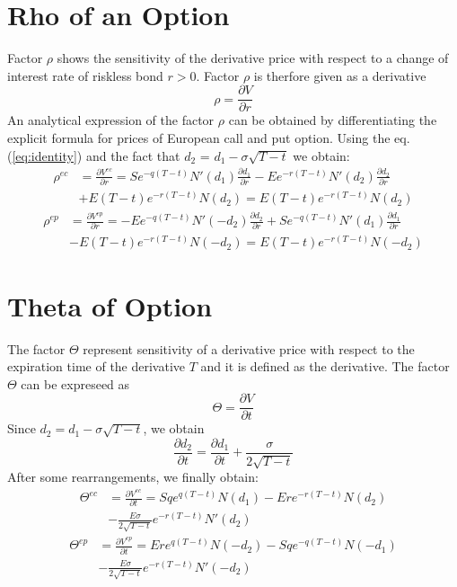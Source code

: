 \documentclass[a4paper]{article}
\begin{document}
\section{Rho of an Option}
Factor $\rho$ shows the sensitivity of the derivative price with respect to a change of interest rate of riskless bond $r > 0$. Factor $\rho$ is therfore given as a derivative 
\begin{equation}
    \rho = \frac{\partial V}{\partial r}
\end{equation}
An analytical expression of the factor $\rho$ can be obtained by differentiating the explicit formula for prices of European call and put option. Using the eq.(\ref{eq:identity}) and the fact
that $d_2$ = $d_1 - \sigma \sqrt{T-t}$ we obtain:
\begin{align}
    \rho^{ec} &= \frac{\partial V^{ec}}{\partial r} = S e^{-q(T-t)} N'(d_1) \frac{\partial d_1}{\partial r} - E e^{-r(T-t)}N'(d_2)\frac{\partial d_2}{\partial r}\\
              &+ E(T-t)e^{-r(T-t)} N(d_2) = E(T-t)e^{-r(T-t)}N(d_2)
\end{align}
\begin{align}
    \rho^{ep} &= \frac{\partial V^{ep}}{\partial r} = -E e^{-q(T-t)} N'(- d_2) \frac{\partial d_2}{\partial r} + S e^{-q(T-t)}N'(d_1)\frac{\partial d_1}{\partial r}\\
              &- E(T-t)e^{-r(T-t)} N(-d_2) = E(T-t)e^{-r(T-t)}N(-d_2)
\end{align}

\section{Theta of Option}
The factor $\Theta$ represent sensitivity of a derivative price with respect to the expiration time of the derivative $T$ and it is defined as the derivative. The factor $\Theta$
can be expreseed as
\begin{equation}
    \Theta = \frac{\partial V}{\partial t}
\end{equation}
Since $d_2 = d_1 - \sigma \sqrt{T-t}$, we obtain 
\begin{equation}
    \frac{\partial d_2}{\partial t} = \frac{\partial d_1}{\partial t} + \frac{\sigma}{2 \sqrt{T-t}}
\end{equation}
After some rearrangements, we finally obtain:
\begin{align}
    \Theta^{ec} &= \frac{\partial V^{ec}}{\partial t} = Sqe^{q(T-t)}N(d_1)-Ere^{-r(T-t)}N(d_2)\\
    &- \frac{E \sigma }{2 \sqrt{T-t}}e^{-r(T-t)}N'(d_2)
\end{align}
\begin{align}
    \Theta^{ep} &= \frac{\partial V^{ep}}{\partial t} = Ere^{q(T-t)}N(-d_2)-Sqe^{-q(T-t)}N(-d_1)\\
    &- \frac{E \sigma }{2 \sqrt{T-t}}e^{-r(T-t)}N'(-d_2)
\end{align}
\end{document}
